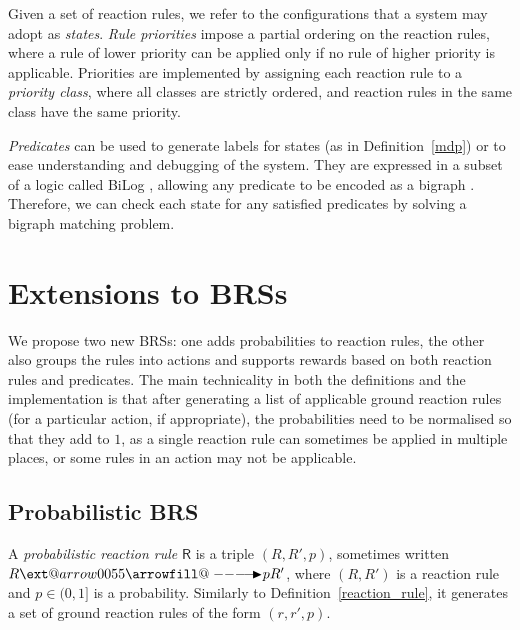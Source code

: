 \documentclass[runningheads]{llncs}
\makeatletter
\providecommand\longrightarrowRHD{\relbar\joinrel\relbar\joinrel\mathrel\RHD}
\providecommand*\xrightarrowRHD[2][]{\ext@arrow 0055{\arrowfill@\relbar\relbar\longrightarrowRHD}{#1}{#2}}
\makeatother
\begin{document}
Given a set of reaction rules, we refer to the configurations that a system may
adopt as \emph{states}. \emph{Rule priorities}
\cite{DBLP:journals/tcs/BaetenBKW89} impose a partial ordering on the reaction
rules, where a rule of lower priority can be applied only if no rule of higher
priority is applicable. Priorities are implemented by assigning each reaction
rule to a \emph{priority class}, where all classes are strictly ordered, and
reaction rules in the same class have the same priority.

\emph{Predicates} can be used to generate labels for states (as in
Definition~\ref{mdp}) or to ease understanding and debugging of the system. They
are expressed in a subset of a logic called BiLog
\cite{DBLP:conf/icalp/ConfortiMS05}, allowing any predicate to be encoded as a
bigraph \cite{DBLP:journals/scp/CalderKSS14,DBLP:phd/ethos/Sevegnani12}.
Therefore, we can check each state for any satisfied predicates by solving a
bigraph matching problem.

\section{Extensions to BRSs} \label{extensions}

We propose two new BRSs: one adds probabilities to reaction rules, the other
also groups the rules into actions and supports rewards based on both reaction
rules and predicates. The main technicality in both the definitions and the
implementation is that after generating a list of applicable ground reaction
rules (for a particular action, if appropriate), the probabilities need to be
normalised so that they add to $1$, as a single reaction rule can sometimes be
applied in multiple places, or some rules in an action may not be applicable.

\subsection{Probabilistic BRS}

\begin{definition}
  A \emph{probabilistic reaction rule} $\mathsf{R}$ is a triple $(R, R', p)$,
  sometimes written $R \xrightarrowRHD{p} R'$, where $(R, R')$ is a reaction
  rule and $p \in (0, 1]$ is a probability. Similarly to
  Definition~\ref{reaction_rule}, it generates a set of ground reaction rules of
  the form $(r, r', p)$.
\end{definition}
\end{document}
